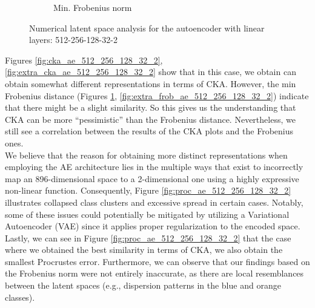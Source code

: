 \documentclass[../main.tex]{subfiles}
\begin{document}
\begin{figure}[ht!]
\begin{subfigure}[b]{0.45\textwidth}
        \caption{Min. Frobenius norm}
         \label{fig:frob_ae_512_256_128_32_2}
     \end{subfigure}
    \caption{Numerical latent space analysis for the autoencoder with linear layers: 512-256-128-32-2}
    \label{fig:lat_num_ae_512_256_128_32_2}
\end{figure}

Figures \ref{fig:cka_ae_512_256_128_32_2}, \ref{fig:extra_cka_ae_512_256_128_32_2} show that in this case, we obtain can obtain somewhat different representations in terms of CKA. However, the min Frobenius distance (Figures \ref{fig:frob_ae_512_256_128_32_2}, \ref{fig:extra_frob_ae_512_256_128_32_2}) indicate that there might be a slight similarity. So this gives us the understanding that CKA can be more ``pessimistic'' than the Frobenius distance. Nevertheless, we still see a correlation between the results of the CKA plots and the Frobenius ones.\\

We believe that the reason for obtaining more distinct representations when employing the AE architecture lies in the multiple ways that exist to incorrectly map an 896-dimensional space to a 2-dimensional one using a highly expressive non-linear function. Consequently, Figure \ref{fig:proc_ae_512_256_128_32_2} illustrates collapsed class clusters and excessive spread in certain cases. Notably, some of these issues could potentially be mitigated by utilizing a Variational Autoencoder (VAE) since it applies proper regularization to the encoded space.\\

Lastly, we can see in Figure \ref{fig:proc_ae_512_256_128_32_2} that the case where we obtained the best similarity in terms of CKA, we also obtain the smallest Procrustes error. Furthermore, we can observe that our findings based on the Frobenius norm were not entirely inaccurate, as there are local resemblances between the latent spaces (e.g., dispersion patterns in the blue and orange classes).
\end{document}
